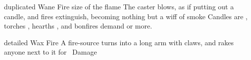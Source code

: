 \ifodd\value{diceNo}

  {duplicated}%
  {Wane}%
  {Fire}%
  {size of the flame}%
  {The caster blows, as if putting out a candle, and  fires extinguish, becoming nothing but a wiff of smoke}%
  {Candles are \tn[6], torches \tn[7], hearths \tn[8], and bonfires demand \tn[9] or more.}

\else

  {detailed}%
  {Wax}%
  {Fire}%
  {}%
  {A fire-source turns into a long arm with claws, and rakes anyone next to it for \showDam~Damage}%
  {}

\fi
{}
